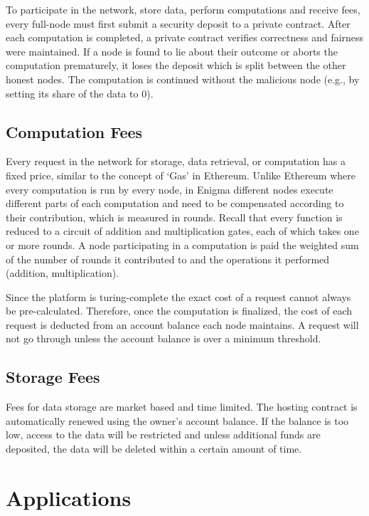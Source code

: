 \documentclass{article} \usepackage{nips13submit_e,times}
\begin{document}
To participate in the network, store data, perform computations and receive fees, every full-node must first submit a security deposit to a private contract. After each computation is completed, a private contract verifies correctness and fairness were maintained. If a node is found to lie about their outcome or aborts the computation prematurely, it loses the deposit which is split between the other honest nodes. The computation is continued without the malicious node (e.g., by setting its share of the data to 0).


\subsection{Computation Fees}

Every request in the network for storage, data retrieval, or computation has a fixed price, similar to the concept of ‘Gas’ in Ethereum. Unlike Ethereum where every computation is run by every node, in Enigma different nodes execute different parts of each computation and need to be compensated according to their contribution, which is measured in rounds. Recall that every function is reduced to a circuit of addition and multiplication gates, each of which takes one or more rounds. A node participating in a computation is paid the weighted sum of the number of rounds it contributed to and the operations it performed (addition, multiplication).



Since the platform is turing-complete the exact cost of a request cannot always be pre-calculated. Therefore, once the computation is finalized, the cost of each request is deducted from an account balance each node maintains. A request will not go through unless the account balance is over a minimum threshold.

\subsection{Storage Fees}

Fees for data storage are market based and time limited. The hosting contract is automatically renewed using the owner's account balance. If the balance is too low, access to the data will be restricted and unless additional funds are deposited, the data will be deleted within a certain amount of time.


\section{Applications}
\end{document}
